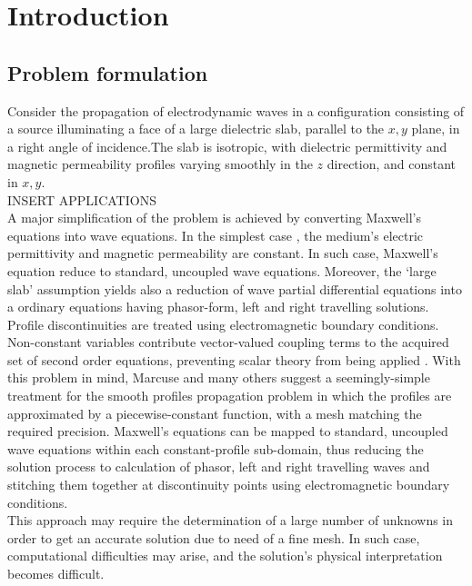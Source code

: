\documentclass[twocolumn,secnumarabic,amssymb, nobibnotes, aps, prd]{revtex4-1}
\begin{document}
\section{Introduction}
\subsection{Problem formulation}
Consider the propagation of electrodynamic waves in a configuration consisting of a source illuminating a face of a large dielectric slab, parallel to the $x,y$ plane, in a right angle of incidence.The slab is isotropic, with dielectric permittivity and magnetic permeability profiles varying smoothly in the $z$ direction, and constant in $x,y$. \\

INSERT APPLICATIONS \\
A major simplification of the problem is achieved by converting Maxwell's equations into wave equations. In the simplest case \cite{jackson1999classical, cheng2006fieldAndWave}, the medium's electric permittivity and  magnetic permeability are constant. In such case, Maxwell's equation reduce to standard, uncoupled wave equations. Moreover, the `large slab' assumption yields also a reduction of wave partial differential equations into a ordinary equations having phasor-form, left and right travelling solutions. Profile discontinuities are treated using electromagnetic boundary conditions. \\
Non-constant variables contribute vector-valued coupling terms to the acquired set of second order equations, preventing scalar theory from being applied \cite{goodman2005introduction}.  With  this problem in mind, Marcuse  \cite{marcuse1982light} and many others suggest a seemingly-simple treatment for the smooth profiles propagation problem in which the profiles are approximated by a piecewise-constant function, with a mesh matching the required precision. Maxwell's equations can be mapped to standard, uncoupled wave equations within each constant-profile sub-domain, thus reducing the solution process to calculation of phasor, left and right  travelling waves and stitching them together at discontinuity points using electromagnetic boundary conditions. \\
This approach may require the determination of a large number of unknowns in order to get an accurate solution due to need of a fine mesh. In such case, computational difficulties may arise, and the solution's physical interpretation becomes difficult. \\
\end{document}
